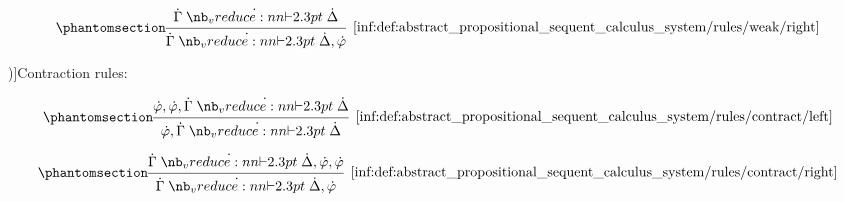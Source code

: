 \begin{definition}
\begin{thmenum}
\begin{paracol}{2}
      \begin{rightcolumn}
        \ParacolAlignmentHack
        \begin{equation*}\taglabel[\ensuremath{ \logic{Weak}_R }]{inf:def:abstract_propositional_sequent_calculus_system/rules/weak/right}
          \begin{prooftree}
            \hypo{ \syn\Gamma \synvdash \syn\Delta }
            \infer1[\ref{inf:def:abstract_propositional_sequent_calculus_system/rules/weak/right}]{ \syn\Gamma \synvdash \syn\Delta, \syn\varphi }
          \end{prooftree}
        \end{equation*}
      \end{rightcolumn}
    \end{paracol}

     \term[ru=правила сокращения (\cite[218]{КолмогоровДрагалин2006Логика})]{Contraction rules}:
    \begin{paracol}{2}
      \begin{leftcolumn}
        \ParacolAlignmentHack
        \begin{equation*}\taglabel[\ensuremath{ \logic{Contr}_L }]{inf:def:abstract_propositional_sequent_calculus_system/rules/contract/left}
          \begin{prooftree}
            \hypo{ \syn\varphi, \syn\varphi, \syn\Gamma \synvdash \syn\Delta }
            \infer1[\ref{inf:def:abstract_propositional_sequent_calculus_system/rules/contract/left}]{ \syn\varphi, \syn\Gamma \synvdash \syn\Delta }
          \end{prooftree}
        \end{equation*}
      \end{leftcolumn}

      \begin{rightcolumn}
        \ParacolAlignmentHack
        \begin{equation*}\taglabel[\ensuremath{ \logic{Contr}_R }]{inf:def:abstract_propositional_sequent_calculus_system/rules/contract/right}
          \begin{prooftree}
            \hypo{ \syn\Gamma \synvdash \syn\Delta, \syn\varphi, \syn\varphi }
            \infer1[\ref{inf:def:abstract_propositional_sequent_calculus_system/rules/contract/right}]{ \syn\Gamma \synvdash \syn\Delta, \syn\varphi }
          \end{prooftree}
        \end{equation*}
      \end{rightcolumn}
    \end{paracol}


\end{thmenum}
\end{definition}
